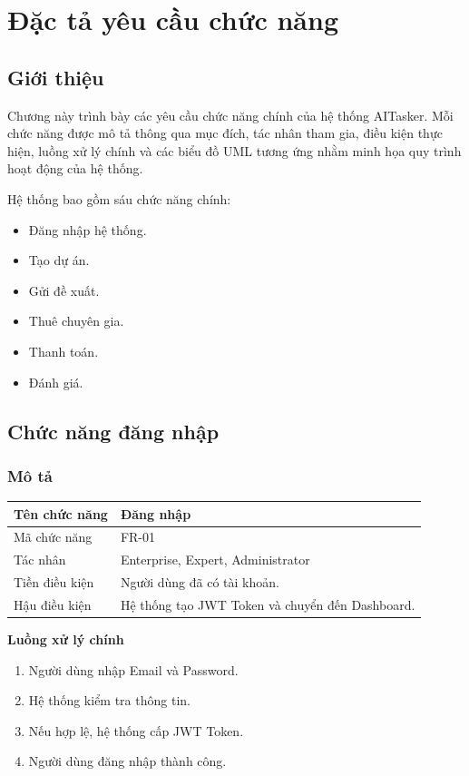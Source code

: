\chapter{Đặc tả yêu cầu chức năng}

\section{Giới thiệu}

Chương này trình bày các yêu cầu chức năng chính của hệ thống AITasker.
Mỗi chức năng được mô tả thông qua mục đích, tác nhân tham gia, điều kiện
thực hiện, luồng xử lý chính và các biểu đồ UML tương ứng nhằm minh họa
quy trình hoạt động của hệ thống.

Hệ thống bao gồm sáu chức năng chính:

\begin{itemize}
\item Đăng nhập hệ thống.
\item Tạo dự án.
\item Gửi đề xuất.
\item Thuê chuyên gia.
\item Thanh toán.
\item Đánh giá.
\end{itemize}


\section{Chức năng đăng nhập}

\subsection{Mô tả}

\begin{longtable}{|p{4cm}|p{10cm}|}
\hline
Tên chức năng & Đăng nhập \\ \hline
Mã chức năng & FR-01 \\ \hline
Tác nhân & Enterprise, Expert, Administrator \\ \hline
Tiền điều kiện & Người dùng đã có tài khoản. \\ \hline
Hậu điều kiện & Hệ thống tạo JWT Token và chuyển đến Dashboard. \\ \hline
\end{longtable}

\textbf{Luồng xử lý chính}

\begin{enumerate}
\item Người dùng nhập Email và Password.
\item Hệ thống kiểm tra thông tin.
\item Nếu hợp lệ, hệ thống cấp JWT Token.
\item Người dùng đăng nhập thành công.
\end{enumerate}

